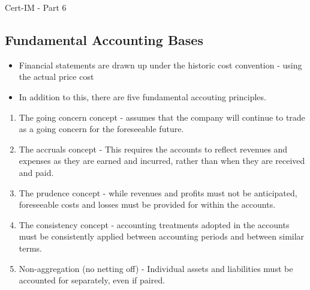 Cert-IM - Part 6

\subsection{Fundamental Accounting Bases}

\begin{itemize}
\item Financial statements are drawn up under the historic cost convention - using
the actual price cost
\item In addition to this, there are five fundamental accouting principles.
\end{itemize}
\begin{enumerate}
\item The going concern concept - assumes that the company will continue to trade as a going concern for the
foreseeable future.

\item The accruals concept - This requires the accounts to reflect revenues and expenses
as they are earned and incurred, rather than when they are received and paid.

\item The prudence concept - while revenues and profits must not be anticipated, foreseeable costs and losses
must be provided for within the accounts.

\item The consistency concept - accounting treatments adopted in the accounts must
be consistently applied between accounting periods and between similar terms.

\item Non-aggregation (no netting off) - Individual assets and liabilities must be
accounted for separately, even if paired.

\end{enumerate}


